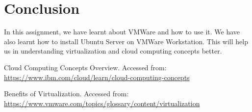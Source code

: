 \documentclass[11pt]{article}
\begin{document}
\section{Conclusion}
In this assignment, we have learnt about VMWare and how to use it. We have also learnt how to install Ubuntu Server on VMWare Workstation. This will help us in understanding virtualization and cloud computing concepts better.

\clearpage

\pagebreak
\begin{thebibliography}{}

    Cloud Computing Concepts Overview.
    Accessed from: \url{https://www.ibm.com/cloud/learn/cloud-computing-concepts}

    Benefits of Virtualization.
    Accessed from: \url{https://www.vmware.com/topics/glossary/content/virtualization}

\end{thebibliography}
\end{document}
